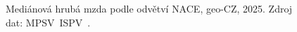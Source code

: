 \def\strProblemySektorMzdyCzTitle{\acs{geo-CZ}: mediánová mzda podle odvětví \acs{NACE} (\acs{ISPV} 2025)}%
\def\strProblemySektorMzdyCzXlabel{index (medián ekonomiky = 100)}%
\def\strProblemySektorMzdyCzCaption{Mediánová hrubá mzda podle odvětví \acs{NACE}, \acs{geo-CZ}, 2025. Zdroj dat: \acs{MPSV}~\acs{ISPV}~\cite{mpsv_ispv}.}%
%
\begin{figure}[H]
  \centering
  
  \caption{\strProblemySektorMzdyCzCaption}
  \label{fig:problemy_sektor_mzdy_cz}
\end{figure}
